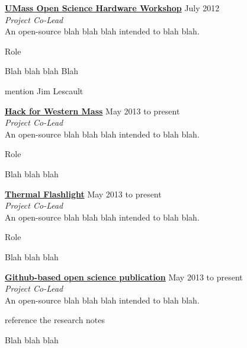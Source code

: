 \documentclass[10pt]{article}
\newcommand{\blankline}{\quad\pagebreak[3]}
\newcommand{\halfblankline}{\quad\vspace{-0.5\baselineskip}\pagebreak[3]}
\begin{document}
\blankline

\href{http://open-eie.io}{\textbf{UMass Open Science Hardware Workshop}} \hfill {July 2012} \\
\emph{Project Co-Lead} \\
An open-source blah blah blah intended to blah blah.
    \begin{innerlist}
        \item Role
        \item Blah blah blah Blah 
        \item mention Jim Lescault
\end{innerlist}

\blankline


\href{http://openwaterproject.io}{\textbf{Hack for Western Mass}} \hfill {May 2013 to present} \\
\emph{Project Co-Lead} \\
An open-source blah blah blah intended to blah blah.
    \begin{innerlist}
        \item Role
        \item Blah blah blah 

\end{innerlist}

\halfblankline

\href{http://openwaterproject.io}{\textbf{Thermal Flashlight}} \hfill {May 2013 to present} \\
\emph{Project Co-Lead} \\
An open-source blah blah blah intended to blah blah.
    \begin{innerlist}
        \item Role
        \item Blah blah blah 

\end{innerlist}

\halfblankline

\href{http://openwaterproject.io}{\textbf{Github-based open science publication}} \hfill {May 2013 to present} \\
\emph{Project Co-Lead} \\
An open-source blah blah blah intended to blah blah.
    \begin{innerlist}
        \item reference the research notes
        \item Blah blah blah 

\end{innerlist}
\end{document}
